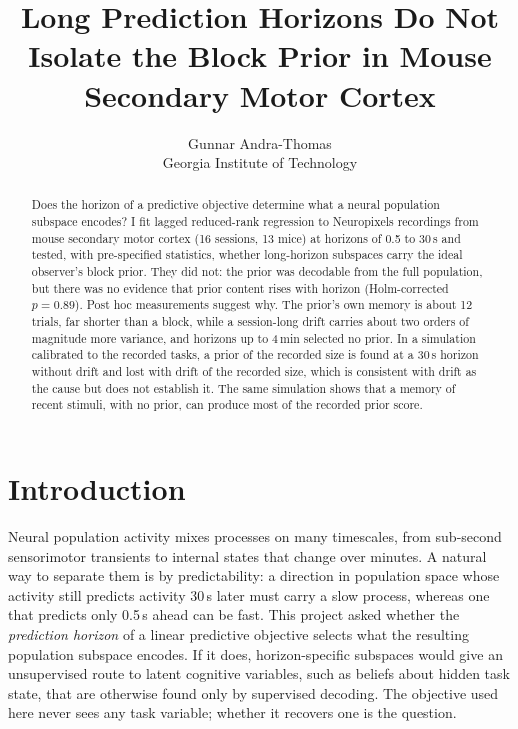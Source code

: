 \documentclass{article}
\title{Long Prediction Horizons Do Not Isolate the Block Prior in Mouse Secondary Motor Cortex}
\author{%
  Gunnar Andra-Thomas\\
  Georgia Institute of Technology
}
\begin{document}
\maketitle

\begin{abstract}
Does the horizon of a predictive objective determine what a neural population subspace encodes? I fit lagged
reduced-rank regression to Neuropixels recordings from mouse secondary motor cortex (16 sessions, 13 mice) at horizons
of 0.5 to 30\,s and tested, with pre-specified statistics, whether long-horizon subspaces carry the ideal observer's
block prior. They did not: the prior was decodable from the full population, but there was no evidence that prior
content rises with horizon (Holm-corrected $p = 0.89$). Post hoc measurements suggest why. The prior's own memory is
about 12 trials, far shorter than a block, while a session-long drift carries about two orders of magnitude more
variance, and horizons up to 4\,min selected no prior. In a simulation calibrated to the recorded tasks, a prior of
the recorded size is found at a 30\,s horizon without drift and lost with drift of the recorded size, which is
consistent with drift as the cause but does not establish it. The same simulation shows that a memory of recent
stimuli, with no prior, can produce most of the recorded prior score.
\end{abstract}

\section{Introduction}
\label{sec:intro}

Neural population activity mixes processes on many timescales, from sub-second sensorimotor transients to internal
states that change over minutes. A natural way to separate them is by predictability: a direction in population space
whose activity still predicts activity 30\,s later must carry a slow process, whereas one that predicts only 0.5\,s
ahead can be fast. This project asked whether the \emph{prediction horizon} of a linear predictive objective selects
what the resulting population subspace encodes. If it does, horizon-specific subspaces would give an unsupervised
route to latent cognitive variables, such as beliefs about hidden task state, that are otherwise found only by
supervised decoding. The objective used here never sees any task variable; whether it recovers one is the question.
\end{document}

